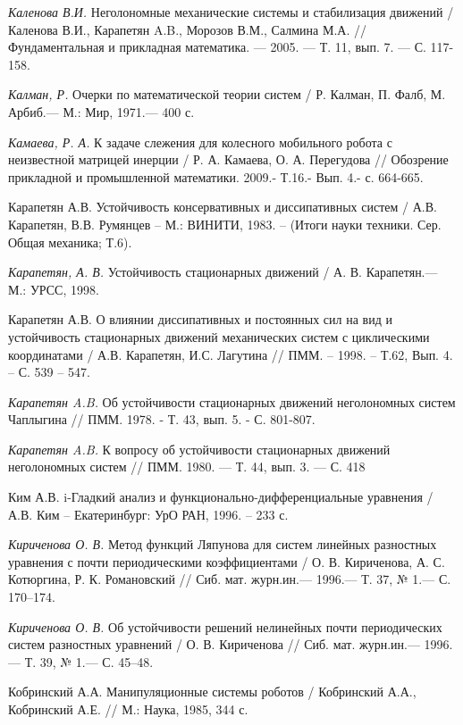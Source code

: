 \begin{thebibliography}{10}
	{\it Каленова В.И.} Неголономные механические системы и стабилизация движений / Каленова В.И., Карапетян A.B., Морозов В.М., Салмина М.А. // Фундаментальная и прикладная математика. — 2005. — Т. 11, вып. 7. — С. 117-158.
	
	{\it Калман, Р.} Очерки по математической теории систем / Р. Калман, П. Фалб, М. Арбиб.—
	М.: Мир, 1971.— 400 с.
	
	
	{\it Камаева, Р. А.} К задаче слежения для колесного мобильного робота с неизвестной матрицей инерции / Р. А. Камаева, О. А. Перегудова // Обозрение прикладной и промышленной математики. 2009.- Т.16.- Вып. 4.- с. 664-665.
	
	Карапетян А.В. Устойчивость консервативных и диссипативных систем / А.В. Карапетян, В.В. Румянцев – М.: ВИНИТИ, 1983. – (Итоги науки  техники. Сер. Общая механика; Т.6).
	
	{\it Карапетян, А. В.} Устойчивость стационарных движений / А. В. Карапетян.—
	М.: УРСС, 1998.
	
	Карапетян А.В. О влиянии диссипативных и постоянных сил на вид и устойчивость стационарных движений механических систем с циклическими координатами / А.В. Карапетян, И.С. Лагутина // ПММ. – 1998. – Т.62, Вып. 4. – С. 539 – 547.
	
	{\it Карапетян A.B.} Об устойчивости стационарных движений неголономных систем Чаплыгина // ПММ. 1978. - Т. 43, вып. 5. - С. 801-807.
	
	{\it Карапетян A.B.} К вопросу об устойчивости стационарных движений неголономных систем // ПММ. 1980. — Т. 44, вып. 3. — С. 418
	
	Ким А.В. i-Гладкий анализ и функционально-дифференциальные уравнения / А.В. Ким – Екатеринбург: УрО РАН, 1996. – 233 с.
	
	{\it Кириченова О. В.} Метод функций Ляпунова для систем линейных разностных уравнения с почти периодическими коэффициентами / О. В. Кириченова, А. С. Котюргина, Р. К. Романовский //
	Сиб. мат. журн.ин.— 1996.— Т. 37, № 1.— С. 170–174.
	
	{\it Кириченова О. В.} Об устойчивости решений нелинейных почти периодических систем разностных уравнений / О. В. Кириченова // Сиб. мат. журн.ин.— 1996.— Т. 39, № 1.— С. 45–48.
	
	Кобринский А.А. Манипуляционные системы роботов / Кобринский А.А., Кобринский А.Е. // М.: Наука, 1985, 344 с.
	

\end{thebibliography}
